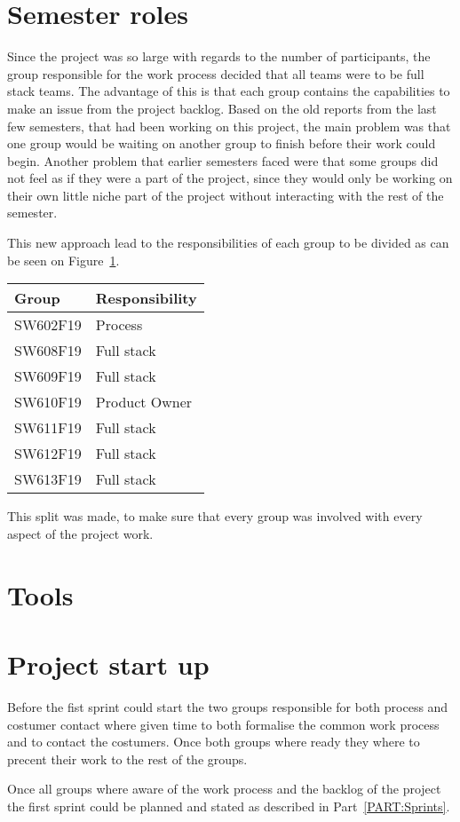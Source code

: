 \section{Semester roles}
Since the project was so large with regards to the number of participants, the group responsible for the work process decided that all teams were to be full stack teams. 
The advantage of this is that each group contains the capabilities to make an issue from the project backlog. 
Based on the old reports from the last few semesters, that had been working on this project, the main problem was that one group would be waiting on another group to finish before their work could begin. 
Another problem that earlier semesters faced were that some groups did not feel as if they were a part of the project, since they would only be working on their own little niche part of the project without interacting with the rest of the semester.

This new approach lead to the responsibilities of each group to be divided as can be seen on Figure~\ref{TBL:GroupResponsibility}.

\begin{table}[H]
\centering
\begin{tabular}{|l|l|}
\hline
\textbf{Group} & \textbf{Responsibility} \\ \hline
SW602F19 & Process\\ \hline
SW608F19 & Full stack\\ \hline
SW609F19 & Full stack\\ \hline
SW610F19 & Product Owner  \\ \hline
SW611F19 & Full stack \\ \hline
SW612F19 & Full stack \\ \hline
SW613F19 & Full stack \\ \hline
\end{tabular}
\label{TBL:GroupResponsibility}
\end{table}

This split was made, to make sure that every group was involved with every aspect of the project work.

\section{Tools}

\section{Project start up}
Before the fist sprint could start the two groups responsible for both process and costumer contact where given time to both formalise the common work process and to contact the costumers. 
Once both groups where ready they where to precent their work to the rest of the groups. 

Once all groups where aware of the work process and the backlog of the project the first sprint could be planned and stated as described in Part~\ref{PART:Sprints}.
